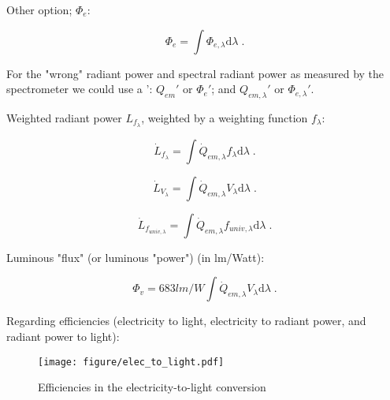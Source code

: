 Other option; $\Phi_{e}$:

\begin{equation}
  \Phi_{e} = \int \Phi_{e, \lambda} \mathrm{d}\lambda \; .
\end{equation}

For the "wrong" radiant power and spectral radiant power as measured by the spectrometer we could use a ': $Q_{em}'$ or $\Phi_{e}'$; and $Q_{em, \lambda}'$ or $\Phi_{e, \lambda}'$.


Weighted radiant power $L_{f_\lambda}$, weighted by a weighting function $f_\lambda$:

\begin{equation}
  \dot{L}_{f_{\lambda}} = \int \dot{Q}_{em, \lambda} f_{\lambda} \mathrm{d}\lambda \; .
\end{equation}

\begin{equation}
  \dot{L}_{V_{\lambda}} = \int \dot{Q}_{em, \lambda} V_{\lambda} \mathrm{d}\lambda \; .
\end{equation}

\begin{equation}
  \dot{L}_{f_{univ, \lambda}} = \int \dot{Q}_{em, \lambda} f_{univ, \lambda} \mathrm{d}\lambda \; .
\end{equation}


Luminous "flux" (or luminous "power") (in lm/Watt):

\begin{equation}
  \Phi_{v} = 683 lm/W \int \dot{Q}_{em, \lambda} V_{\lambda} \mathrm{d}\lambda \; .
\end{equation}


Regarding efficiencies (electricity to light, electricity to radiant power, and radiant power to light):

\begin{figure}
\centering
\texttt{[image: figure/elec\_to\_light.pdf]}
\caption{Efficiencies in the electricity-to-light conversion}
\end{figure}


